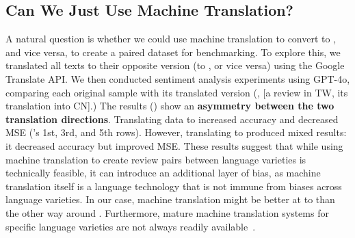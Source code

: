 

\subsection{Can We Just Use Machine Translation?}
A natural question is whether we could use machine translation to convert \twChinese to \cnChinese, and vice versa, to create a paired dataset for benchmarking. 
To explore this, %
we translated all texts to their opposite version (\twChinese to \cnChinese, or vice versa) using the Google Translate API.
We then conducted sentiment analysis experiments using GPT-4o, comparing each original sample with its translated version (\eg, [a review in TW, its translation into CN].)
The results () show an \textbf{asymmetry between the two translation directions}.
Translating \twChinese data to \cnChinese increased accuracy and decreased MSE ('s 1st, 3rd, and 5th rows).
However, translating \cnChinese to \twChinese produced mixed results: it decreased accuracy but improved MSE.
These results suggest that while using machine translation to create review pairs between language varieties is technically feasible, it can introduce an additional layer of bias, as machine translation itself is a language technology that is not immune from biases across language varieties.
In our case, machine translation might be better at \twChinese to \cnChinese than the other way around \cite{kantharuban2023quantifying}. %
Furthermore, mature machine translation systems for specific language varieties are not always readily available~\cite{multivaluebench,kumar-etal-2021-machine}.







